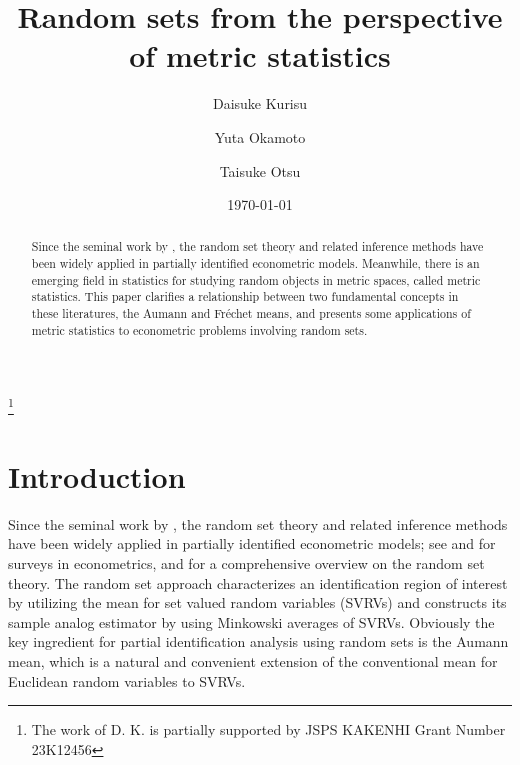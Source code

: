 \documentclass[11pt,reqno]{amsart}
\begin{document}
\title[]{Random sets from the perspective of metric statistics}
\thanks{The work of D. K. is partially supported by JSPS KAKENHI Grant Number 23K12456} 
\date{\today}

\author[D. Kurisu]{Daisuke Kurisu}
\author[Y. Okamoto]{Yuta Okamoto}
\author[T. Otsu]{Taisuke Otsu}

\address[D. Kurisu]{Center for Spatial Information Science, The University of Tokyo\\
5-1-5, Kashiwanoha, Kashiwa-shi, Chiba 277-8568, Japan.}

\address[Y. Okamoto]{Graduate School of Economics, Kyoto University, Yoshida Honmachi, Sakyo, Kyoto 606-8501, Japan.
}

\address[T. Otsu]{Department of Economics, London School of Economics, Houghton Street, London, WC2A 2AE, UK.}

\begin{abstract}
Since the seminal work by \cite{BeMo08}, the random set theory and related inference methods have been widely applied in partially identified econometric models. Meanwhile, there is an emerging field in statistics for studying random objects in metric spaces, called metric statistics. This paper clarifies a relationship between two fundamental concepts in these literatures, the Aumann and Fr\'echet means, and presents some applications of metric statistics to econometric problems involving random sets.
\end{abstract}


\maketitle

\section{Introduction}

Since the seminal work by \cite{BeMo08}, the random set theory and related inference methods have been widely applied in partially identified econometric models; see \cite{MoMo18} and \cite{Mo20} for surveys in econometrics, and \cite{Mo17} for a comprehensive overview on the random set theory. The random set approach characterizes an identification region of interest by utilizing the \cite{Au65} mean for set valued random variables (SVRVs) and constructs its sample analog estimator by using  Minkowski averages of SVRVs. Obviously the key ingredient for partial identification analysis using random sets is the Aumann mean, which is a natural and convenient extension of the conventional mean for Euclidean random variables to SVRVs.
\end{document}
